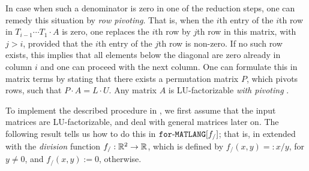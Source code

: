 In case when such a denominator is zero in one of the reduction steps, one can remedy this situation by \textit{row pivoting}. That is, when the $i$th entry of the
$i$th row in $T_{i-1}\cdots T_1\cdot A$ is zero, one replaces the $i$th row by  $j$th row in this matrix, with $j>i$, provided that the $i$th entry of the $j$th row is non-zero. If no such row exists, this implies that all elements below the diagonal are zero already in column $i$ and one can proceed with the next column. One can formulate this in matrix terms by stating that there exists a permutation matrix $P$, which pivots rows, such that $P\cdot A=L\cdot U$. Any matrix $A$ is LU-factorizable \textit{with pivoting} \cite{num}.

To implement the described procedure in \langfor, we first assume that the input matrices are LU-factorizable, and  deal with general matrices later on. The following result tells us how to do this in $\texttt{for}\text{-}\texttt{MATLANG}[f_/]$; that is, in \langfor extended with the \textit{division} function  $f_/:\mathbb{R}^2\to\mathbb{R}$, which is defined by $f_/(x,y)=:x/y$, for $y\neq 0$, and $f_/(x,y):= 0$, otherwise. %

